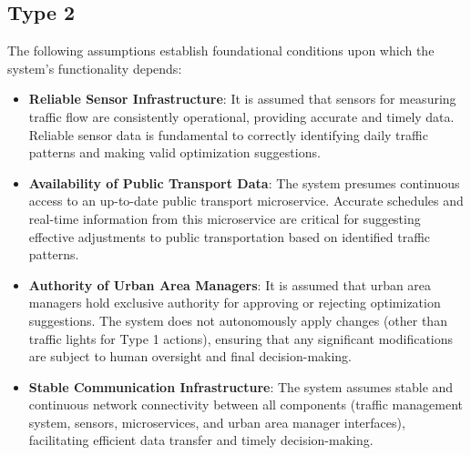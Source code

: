 \documentclass[a4paper,12pt]{article}
\begin{document}
\subsection*{Type 2}
The following assumptions establish foundational conditions upon which the system's functionality depends:
\begin{itemize}
    \item \textbf{Reliable Sensor Infrastructure}: It is assumed that sensors for measuring traffic flow are consistently operational, providing accurate and timely data. Reliable sensor data is fundamental to correctly identifying daily traffic patterns and making valid optimization suggestions.
    \item \textbf{Availability of Public Transport Data}: The system presumes continuous access to an up-to-date public transport microservice. Accurate schedules and real-time information from this microservice are critical for suggesting effective adjustments to public transportation based on identified traffic patterns.
    \item \textbf{Authority of Urban Area Managers}: It is assumed that urban area managers hold exclusive authority for approving or rejecting optimization suggestions. The system does not autonomously apply changes (other than traffic lights for Type 1 actions), ensuring that any significant modifications are subject to human oversight and final decision-making.
    \item \textbf{Stable Communication Infrastructure}: The system assumes stable and continuous network connectivity between all components (traffic management system, sensors, microservices, and urban area manager interfaces), facilitating efficient data transfer and timely decision-making.
\end{itemize}

\newpage
\end{document}

